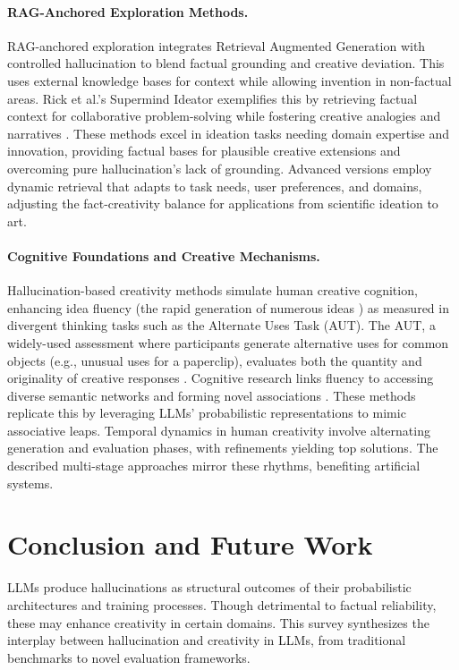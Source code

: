 \documentclass{llncs}
\begin{document}
\paragraph{RAG-Anchored Exploration Methods.}
RAG-anchored exploration integrates Retrieval Augmented Generation with controlled hallucination to blend factual grounding and creative deviation. This uses external knowledge bases for context while allowing invention in non-factual areas. Rick et al.'s Supermind Ideator exemplifies this by retrieving factual context for collaborative problem-solving while fostering creative analogies and narratives \cite{rick2023supermind}.
These methods excel in ideation tasks needing domain expertise and innovation, providing factual bases for plausible creative extensions and overcoming pure hallucination's lack of grounding.
Advanced versions employ dynamic retrieval that adapts to task needs, user preferences, and domains, adjusting the fact-creativity balance for applications from scientific ideation to art.
\paragraph{Cognitive Foundations and Creative Mechanisms.}
Hallucination-based creativity methods simulate human creative cognition, enhancing idea fluency (the rapid generation of numerous ideas \cite{organisciak2023beyond}) as measured in divergent thinking tasks such as the Alternate Uses Task (AUT). The AUT, a widely-used assessment where participants generate alternative uses for common objects (e.g., unusual uses for a paperclip), evaluates both the quantity and originality of creative responses \cite{beaty2021alternate,dumas2014alternates,dumas2020alternate}. 
Cognitive research links fluency to accessing diverse semantic networks and forming novel associations \cite{zedelius2019beyond}. These methods replicate this by leveraging LLMs' probabilistic representations to mimic associative leaps.
Temporal dynamics in human creativity involve alternating generation and evaluation phases, with refinements yielding top solutions. The described multi-stage approaches mirror these rhythms, benefiting artificial systems.


\section{Conclusion and Future Work}

LLMs produce hallucinations as structural outcomes of their probabilistic architectures and training processes. Though detrimental to factual reliability, these may enhance creativity in certain domains. This survey synthesizes the interplay between hallucination and creativity in LLMs, from traditional benchmarks to novel evaluation frameworks.
\end{document}
